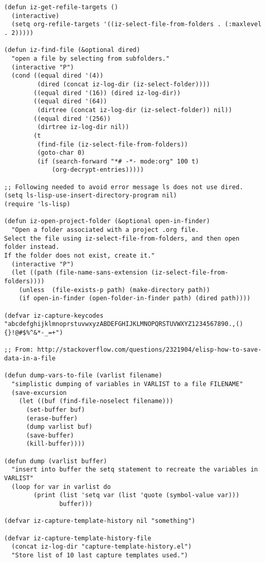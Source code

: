 \documentclass{article}
\begin{document}
\begin{verbatim}
(defun iz-get-refile-targets ()
  (interactive)
  (setq org-refile-targets '((iz-select-file-from-folders . (:maxlevel . 2)))))

(defun iz-find-file (&optional dired)
  "open a file by selecting from subfolders."
  (interactive "P")
  (cond ((equal dired '(4))
         (dired (concat iz-log-dir (iz-select-folder))))
        ((equal dired '(16)) (dired iz-log-dir))
        ((equal dired '(64))
         (dirtree (concat iz-log-dir (iz-select-folder)) nil))
        ((equal dired '(256))
         (dirtree iz-log-dir nil))
        (t
         (find-file (iz-select-file-from-folders))
         (goto-char 0)
         (if (search-forward "*# -*- mode:org" 100 t)
             (org-decrypt-entries)))))

;; Following needed to avoid error message ls does not use dired.
(setq ls-lisp-use-insert-directory-program nil)
(require 'ls-lisp)

(defun iz-open-project-folder (&optional open-in-finder)
  "Open a folder associated with a project .org file.
Select the file using iz-select-file-from-folders, and then open folder instead.
If the folder does not exist, create it."
  (interactive "P")
  (let ((path (file-name-sans-extension (iz-select-file-from-folders))))
    (unless  (file-exists-p path) (make-directory path))
    (if open-in-finder (open-folder-in-finder path) (dired path))))

(defvar iz-capture-keycodes "abcdefghijklmnoprstuvwxyzABDEFGHIJKLMNOPQRSTUVWXYZ1234567890.,(){}!@#$%^&*-_=+")

;; From: http://stackoverflow.com/questions/2321904/elisp-how-to-save-data-in-a-file

(defun dump-vars-to-file (varlist filename)
  "simplistic dumping of variables in VARLIST to a file FILENAME"
  (save-excursion
    (let ((buf (find-file-noselect filename)))
      (set-buffer buf)
      (erase-buffer)
      (dump varlist buf)
      (save-buffer)
      (kill-buffer))))

(defun dump (varlist buffer)
  "insert into buffer the setq statement to recreate the variables in VARLIST"
  (loop for var in varlist do
        (print (list 'setq var (list 'quote (symbol-value var)))
               buffer)))

(defvar iz-capture-template-history nil "something")

(defvar iz-capture-template-history-file
  (concat iz-log-dir "capture-template-history.el")
  "Store list of 10 last capture templates used.")


\end{verbatim}
\end{document}
